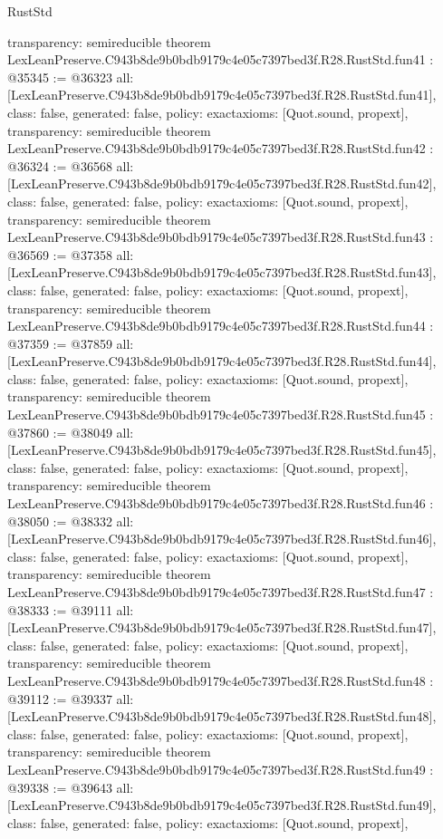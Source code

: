\begin{lexlean}{RustStd}
\begin{coremodule}
{  transparency: semireducible
}
theorem LexLeanPreserve.C943b8de9b0bdb9179c4e05c7397bed3f.R28.RustStd.fun41 : @35345 := @36323 {
  all: [LexLeanPreserve.C943b8de9b0bdb9179c4e05c7397bed3f.R28.RustStd.fun41],
  class: false,
  generated: false,
  policy: exact{axioms: [Quot.sound, propext]},
  transparency: semireducible
}
theorem LexLeanPreserve.C943b8de9b0bdb9179c4e05c7397bed3f.R28.RustStd.fun42 : @36324 := @36568 {
  all: [LexLeanPreserve.C943b8de9b0bdb9179c4e05c7397bed3f.R28.RustStd.fun42],
  class: false,
  generated: false,
  policy: exact{axioms: [Quot.sound, propext]},
  transparency: semireducible
}
theorem LexLeanPreserve.C943b8de9b0bdb9179c4e05c7397bed3f.R28.RustStd.fun43 : @36569 := @37358 {
  all: [LexLeanPreserve.C943b8de9b0bdb9179c4e05c7397bed3f.R28.RustStd.fun43],
  class: false,
  generated: false,
  policy: exact{axioms: [Quot.sound, propext]},
  transparency: semireducible
}
theorem LexLeanPreserve.C943b8de9b0bdb9179c4e05c7397bed3f.R28.RustStd.fun44 : @37359 := @37859 {
  all: [LexLeanPreserve.C943b8de9b0bdb9179c4e05c7397bed3f.R28.RustStd.fun44],
  class: false,
  generated: false,
  policy: exact{axioms: [Quot.sound, propext]},
  transparency: semireducible
}
theorem LexLeanPreserve.C943b8de9b0bdb9179c4e05c7397bed3f.R28.RustStd.fun45 : @37860 := @38049 {
  all: [LexLeanPreserve.C943b8de9b0bdb9179c4e05c7397bed3f.R28.RustStd.fun45],
  class: false,
  generated: false,
  policy: exact{axioms: [Quot.sound, propext]},
  transparency: semireducible
}
theorem LexLeanPreserve.C943b8de9b0bdb9179c4e05c7397bed3f.R28.RustStd.fun46 : @38050 := @38332 {
  all: [LexLeanPreserve.C943b8de9b0bdb9179c4e05c7397bed3f.R28.RustStd.fun46],
  class: false,
  generated: false,
  policy: exact{axioms: [Quot.sound, propext]},
  transparency: semireducible
}
theorem LexLeanPreserve.C943b8de9b0bdb9179c4e05c7397bed3f.R28.RustStd.fun47 : @38333 := @39111 {
  all: [LexLeanPreserve.C943b8de9b0bdb9179c4e05c7397bed3f.R28.RustStd.fun47],
  class: false,
  generated: false,
  policy: exact{axioms: [Quot.sound, propext]},
  transparency: semireducible
}
theorem LexLeanPreserve.C943b8de9b0bdb9179c4e05c7397bed3f.R28.RustStd.fun48 : @39112 := @39337 {
  all: [LexLeanPreserve.C943b8de9b0bdb9179c4e05c7397bed3f.R28.RustStd.fun48],
  class: false,
  generated: false,
  policy: exact{axioms: [Quot.sound, propext]},
  transparency: semireducible
}
theorem LexLeanPreserve.C943b8de9b0bdb9179c4e05c7397bed3f.R28.RustStd.fun49 : @39338 := @39643 {
  all: [LexLeanPreserve.C943b8de9b0bdb9179c4e05c7397bed3f.R28.RustStd.fun49],
  class: false,
  generated: false,
  policy: exact{axioms: [Quot.sound, propext]},
}
\end{coremodule}
\end{lexlean}
